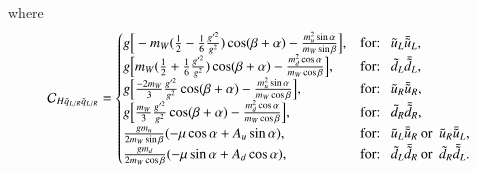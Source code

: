 \documentclass[final,3p,times]{elsarticle}
\begin{document}
where
\begin{equation}
\mathcal{C}_{H \tilde{q}_{L/R} \tilde{q}_{L/R}} = \begin{cases}
			g\Big[-m_W ({1 \over 2} - {1 \over 6}{g'^2 \over g^2} )\cos(\beta+\alpha) - {m_{u}^2 \sin \alpha \over m_W \sin \beta}\Big], & $for: $\: \: \tilde{u}_L\bar{\tilde{u}}_L, \\
			g\Big[m_W ({1 \over 2} + {1 \over 6}{g'^2 \over g^2} )\cos(\beta+\alpha) - {m_{d}^2 \cos \alpha \over m_W \cos \beta}\Big], & $for: $\: \: \tilde{d}_L\bar{\tilde{d}}_L, \\
			g\Big[{-2m_W \over 3}{g'^2 \over g^2}\cos(\beta+\alpha) - {m_{u}^2 \sin \alpha \over m_W \cos \beta}\Big], & $for:  $\: \: \tilde{u}_R\bar{\tilde{u}}_R, \\
			g\Big[{m_W \over 3}{g'^2 \over g^2}\cos(\beta+\alpha) - {m_{d}^2 \cos \alpha \over m_W \cos \beta}\Big], & $for: $\: \: \tilde{d}_R\bar{\tilde{d}}_R, \\
			{g m_{u} \over 2 m_{W} \sin\beta}(-\mu \cos\alpha + A_{u}\sin\alpha), & $for: $\: \: \tilde{u}_L \bar{\tilde{u}}_R \: $or $\: \tilde{u}_R \bar{\tilde{u}}_L, \\
			{g m_{d} \over 2 m_{W} \cos\beta}(-\mu \sin\alpha + A_{d}\cos\alpha), & $for: $\: \: \tilde{d}_L \bar{\tilde{d}}_R \: $or $\: \tilde{d}_R \bar{\tilde{d}}_L. \\
			\end{cases}
\end{equation}
\end{document}

